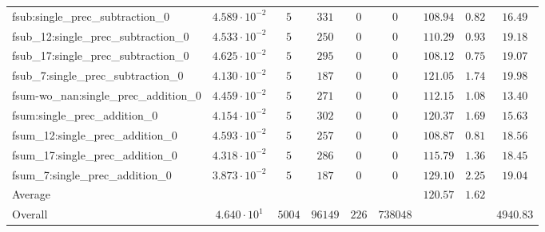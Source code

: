 \begin{tabular}{|l|c|c|c|c|c|c|c|c|}
fsub:single\_prec\_subtraction\_0              & $ 4.589 \cdot 10^{-2} $ & $ 5      $ & $ 331   $ & $ 0   $ & $ 0      $ & $ 108.94      $ & $ 0.82    $ & $ 16.49   $ \\
fsub\_12:single\_prec\_subtraction\_0          & $ 4.533 \cdot 10^{-2} $ & $ 5      $ & $ 250   $ & $ 0   $ & $ 0      $ & $ 110.29      $ & $ 0.93    $ & $ 19.18   $ \\
fsub\_17:single\_prec\_subtraction\_0          & $ 4.625 \cdot 10^{-2} $ & $ 5      $ & $ 295   $ & $ 0   $ & $ 0      $ & $ 108.12      $ & $ 0.75    $ & $ 19.07   $ \\
fsub\_7:single\_prec\_subtraction\_0           & $ 4.130 \cdot 10^{-2} $ & $ 5      $ & $ 187   $ & $ 0   $ & $ 0      $ & $ 121.05      $ & $ 1.74    $ & $ 19.98   $ \\
fsum-wo\_nan:single\_prec\_addition\_0         & $ 4.459 \cdot 10^{-2} $ & $ 5      $ & $ 271   $ & $ 0   $ & $ 0      $ & $ 112.15      $ & $ 1.08    $ & $ 13.40   $ \\
fsum:single\_prec\_addition\_0                 & $ 4.154 \cdot 10^{-2} $ & $ 5      $ & $ 302   $ & $ 0   $ & $ 0      $ & $ 120.37      $ & $ 1.69    $ & $ 15.63   $ \\
fsum\_12:single\_prec\_addition\_0             & $ 4.593 \cdot 10^{-2} $ & $ 5      $ & $ 257   $ & $ 0   $ & $ 0      $ & $ 108.87      $ & $ 0.81    $ & $ 18.56   $ \\
fsum\_17:single\_prec\_addition\_0             & $ 4.318 \cdot 10^{-2} $ & $ 5      $ & $ 286   $ & $ 0   $ & $ 0      $ & $ 115.79      $ & $ 1.36    $ & $ 18.45   $ \\
fsum\_7:single\_prec\_addition\_0              & $ 3.873 \cdot 10^{-2} $ & $ 5      $ & $ 187   $ & $ 0   $ & $ 0      $ & $ 129.10      $ & $ 2.25    $ & $ 19.04   $ \\
\hline
Average                                        & $                     $ & $        $ & $       $ & $     $ & $        $ & $ 120.57      $ & $ 1.62    $ & $         $ \\
\hline
Overall                                        & $ 4.640 \cdot 10^{1}  $ & $ 5004   $ & $ 96149 $ & $ 226 $ & $ 738048 $ & $             $ & $         $ & $ 4940.83 $ \\
\hline
\end{tabular}
